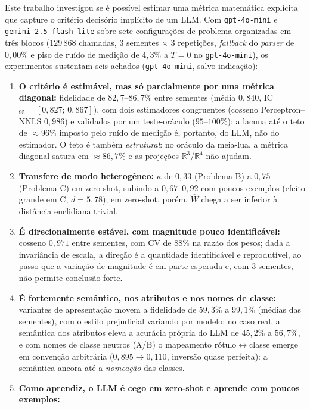 \documentclass[12pt,a4paper]{article}
\newcommand{\West}{\ensuremath{\hat{W}}}   %
\begin{document}
Este trabalho investigou se é possível estimar uma métrica matemática explícita que capture
o critério decisório implícito de um LLM. Com \texttt{gpt-4o-mini} e
\texttt{gemini-2.5-flash-lite} sobre sete configurações de problema organizadas em três
blocos ($129\,868$ chamadas, $3$ sementes $\times$ $3$ repetições, \emph{fallback} do
\emph{parser} de $0{,}00\%$ e piso de ruído de medição de $4{,}3\%$ a $T=0$ no
\texttt{gpt-4o-mini}), os experimentos sustentam seis achados (\texttt{gpt-4o-mini}, salvo
indicação):

\begin{enumerate}
  \item \textbf{O critério é estimável, mas só parcialmente por uma métrica diagonal:}
    fidelidade de $82{,}7$–$86{,}7\%$ entre sementes (média $0{,}840$,
    IC$_{95}=[0{,}827;\,0{,}867]$), com
    dois estimadores congruentes (cosseno Perceptron--NNLS $0{,}986$) e validados por um
    teste-oráculo ($95$–$100\%$); a lacuna até o teto de $\approx 96\%$ imposto pelo ruído
    de medição é, portanto, do LLM, não do estimador. O teto é também \emph{estrutural}: no
    oráculo da meia-lua, a métrica diagonal satura em $\approx 86{,}7\%$ e as projeções
    $\mathbb{R}^3$/$\mathbb{R}^4$ não ajudam.
  \item \textbf{Transfere de modo heterogêneo:} $\kappa$ de $0{,}33$ (Problema B) a $0{,}75$
    (Problema C) em zero-shot, subindo a $0{,}67$–$0{,}92$ com poucos exemplos (efeito
    grande em C, $d=5{,}78$); em zero-shot, porém, \West{} chega a ser inferior à distância
    euclidiana trivial.
  \item \textbf{É direcionalmente estável, com magnitude pouco identificável:} cosseno
    $0{,}971$ entre sementes, com CV de $88\%$ na razão dos pesos; dada a invariância de
    escala, a direção é a quantidade identificável e reprodutível, ao passo que a variação de
    magnitude é em parte esperada e, com $3$ sementes, não permite conclusão forte.
  \item \textbf{É fortemente semântico, nos atributos e nos nomes de classe:}
    variantes de apresentação movem a fidelidade de $59{,}3\%$ a $99{,}1\%$ (médias das
    sementes), com o estilo prejudicial variando por modelo; no caso real,
    a semântica dos atributos eleva a acurácia própria do LLM de $45{,}2\%$ a
    $56{,}7\%$, e com nomes de classe neutros (A/B) o mapeamento rótulo$\leftrightarrow$classe
    emerge em convenção arbitrária ($0{,}895 \to 0{,}110$, inversão quase perfeita): a
    semântica ancora até a \emph{nomeação} das classes.
  \item \textbf{Como aprendiz, o LLM é cego em zero-shot e aprende com poucos exemplos:}

\end{enumerate}
\end{document}
